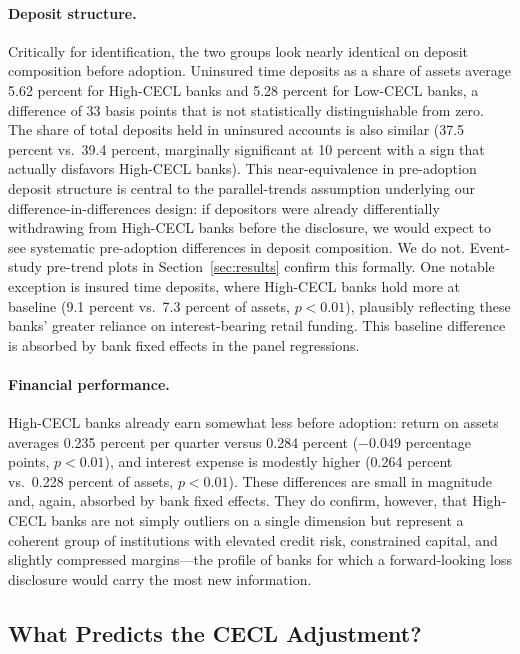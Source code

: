\paragraph{Deposit structure.}
Critically for identification, the two groups look nearly identical on deposit
composition before adoption. Uninsured time deposits as a share of assets
average 5.62 percent for High-CECL banks and 5.28 percent for Low-CECL banks,
a difference of 33 basis points that is not statistically distinguishable from
zero. The share of total deposits held in uninsured accounts is also similar
(37.5 percent vs.\ 39.4 percent, marginally significant at 10 percent with a
sign that actually disfavors High-CECL banks). This near-equivalence in
pre-adoption deposit structure is central to the parallel-trends assumption
underlying our difference-in-differences design: if depositors were already
differentially withdrawing from High-CECL banks before the disclosure, we would
expect to see systematic pre-adoption differences in deposit composition. We do
not. Event-study pre-trend plots in Section~\ref{sec:results} confirm this
formally. One notable exception is insured time deposits, where High-CECL banks
hold more at baseline (9.1 percent vs.\ 7.3 percent of assets, $p < 0.01$),
plausibly reflecting these banks' greater reliance on interest-bearing retail
funding. This baseline difference is absorbed by bank fixed effects in the panel
regressions.

\paragraph{Financial performance.}
High-CECL banks already earn somewhat less before adoption: return on assets
averages 0.235 percent per quarter versus 0.284 percent ($-0.049$ percentage
points, $p < 0.01$), and interest expense is modestly higher (0.264 percent
vs.\ 0.228 percent of assets, $p < 0.01$). These differences are small in
magnitude and, again, absorbed by bank fixed effects. They do confirm, however,
that High-CECL banks are not simply outliers on a single dimension but represent
a coherent group of institutions with elevated credit risk, constrained capital,
and slightly compressed margins---the profile of banks for which a forward-looking
loss disclosure would carry the most new information.

\subsection{What Predicts the CECL Adjustment?}
\label{sec:data:predictors}

